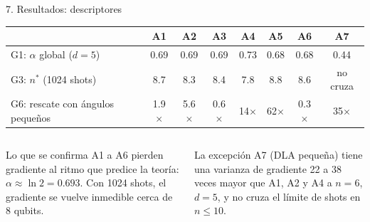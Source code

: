 \documentclass[aspectratio=169,10pt]{beamer}
\begin{document}
\begin{frame}{7. Resultados: descriptores}
\small
\begin{tabularx}{\textwidth}{@{}lccccccc@{}}
\toprule
 & \textbf{A1} & \textbf{A2} & \textbf{A3} & \textbf{A4} & \textbf{A5} & \textbf{A6} & \textbf{A7}\\
\midrule
G1: $\alpha$ global ($d=5$) & 0.69 & 0.69 & 0.69 & 0.73 & 0.68 & 0.68 & 0.44\\
G3: $n^*$ (1024 shots) & 8.7 & 8.3 & 8.4 & 7.8 & 8.8 & 8.6 & no cruza\\
G6: rescate con ángulos pequeños & 1.9$\times$ & 5.6$\times$ & 0.6$\times$ & 14$\times$ & 62$\times$ & 0.3$\times$ & 35$\times$\\
\bottomrule
\end{tabularx}
\vspace{0.6em}
\begin{columns}[T]
\begin{verdebox}{Lo que se confirma}
A1 a A6 pierden gradiente al ritmo que predice la teoría: $\alpha\approx\ln 2=0.693$. Con 1024 shots, el gradiente se vuelve inmedible cerca de 8 qubits.
\end{verdebox}
\begin{ambarbox}{La excepción}
A7 (DLA pequeña) tiene una varianza de gradiente 22 a 38 veces mayor que A1, A2 y A4 a $n=6$, $d=5$, y no cruza el límite de shots en $n\le 10$.
\end{ambarbox}
\end{columns}
\end{frame}
\end{document}
